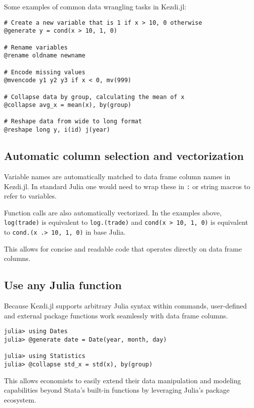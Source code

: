 \documentclass{juliacon}
\begin{document}
Some examples of common data wrangling tasks in Kezdi.jl:

\begin{verbatim}
# Create a new variable that is 1 if x > 10, 0 otherwise
@generate y = cond(x > 10, 1, 0)

# Rename variables
@rename oldname newname

# Encode missing values
@mvencode y1 y2 y3 if x < 0, mv(999)

# Collapse data by group, calculating the mean of x
@collapse avg_x = mean(x), by(group)

# Reshape data from wide to long format
@reshape long y, i(id) j(year)
\end{verbatim}

\subsection{Automatic column selection and vectorization}

Variable names are automatically matched to data frame column names in Kezdi.jl. In standard Julia one would need to wrap these in \texttt{:} or string macros to refer to variables.

Function calls are also automatically vectorized. In the examples above, \texttt{log(trade)} is equivalent to \texttt{log.(trade)} and \texttt{cond(x > 10, 1, 0)} is equivalent to \texttt{cond.(x .> 10, 1, 0)} in base Julia.

This allows for concise and readable code that operates directly on data frame columns.

\subsection{Use any Julia function}

Because Kezdi.jl supports arbitrary Julia syntax within commands, user-defined and external package functions work seamlessly with data frame columns.

\begin{verbatim}
julia> using Dates
julia> @generate date = Date(year, month, day)

julia> using Statistics
julia> @collapse std_x = std(x), by(group) 
\end{verbatim}

This allows economists to easily extend their data manipulation and modeling capabilities beyond Stata's built-in functions by leveraging Julia's package ecosystem.
\end{document}
